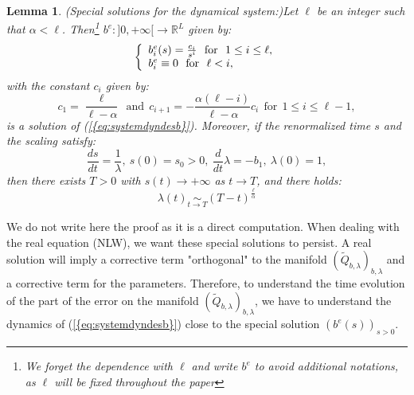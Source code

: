 \documentclass[11pt,a4paper,reqno]{amsart}
\newtheorem{lemma}[theorem]{Lemma}
\theoremstyle{remark}
\numberwithin{equation}{section}
\begin{document}
\begin{lemma}(Special solutions for the dynamical system:)\label{lem:soldusystemd} Let $\ell$ be an integer such that $\alpha<\ell$. Then\footnote{We forget the dependence with $\ell$ and write $b^e$ to avoid additional notations, as $\ell$ will be fixed throughout the paper} $b^e:]0,+\infty[\rightarrow \mathbb{R}^L$ given by:
\begin{equation} \label{linearized:eq:def ci}
\left\{
\begin{array}{l l}
b^e_i(s)=\frac{c_i}{s^i} \ \ \text{for} \ \ 1\leq i \leq \ell ,\\
b^e_i \equiv 0 \ \ \text{for} \ \ \ell<i ,
\end{array}
\right.
\end{equation}
with the constant $c_i$ given by:
\begin{equation}
c_1=\frac{\ell}{\ell-\alpha} \ \ \text{and} \ \ c_{i+1}=-\frac{\alpha(\ell-i)}{\ell-\alpha}c_i \ \ \text{for} \ \ 1\leq i \leq \ell-1 ,
\end{equation}
is a solution of {{\rm (\ref{{eq:systemdyndesb}})}}. Moreover, if the renormalized time $s$ and the scaling satisfy:
$$
\frac{ds}{dt}=\frac{1}{\lambda}, \ s(0)=s_0>0, \ \frac{d}{dt}\lambda =-b_1, \ \lambda(0)=1 ,
$$
then there exists $T>0$ with $s(t)\rightarrow +\infty$ as $t\rightarrow T$, and there holds:
$$
\lambda(t)\underset{t\rightarrow T}{\sim} (T-t)^{\frac{\ell}{\alpha}}
$$
\end{lemma}

We do not write here the proof as it is a direct computation. When dealing with the real equation (NLW), we want these special solutions to persist. A real solution will imply a corrective term "orthogonal" to the manifold $\left(\tilde{Q}_{b,\lambda}\right)_{b,\lambda}$ and a corrective term for the parameters. Therefore, to understand the time evolution of the part of the error on the manifold $\left(\tilde{Q}_{b,\lambda} \right)_{b,\lambda}$, we have to understand the dynamics of {{\rm (\ref{{eq:systemdyndesb}})}} close to the special solution $(b^e(s))_{s>0}$.
\end{document}
